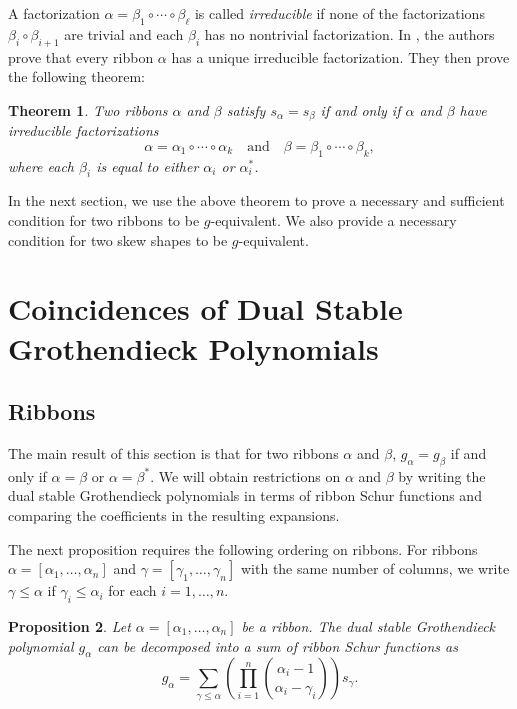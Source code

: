\documentclass[12pt]{amsart}
\newtheorem{thm}{Theorem}[section]
\newtheorem{prop}[thm]{Proposition}
\theoremstyle{definition}
\begin{document}
A factorization $\alpha = \beta_1 \circ \cdots \circ \beta_{\ell}$ is called \textit{irreducible} if none of the factorizations $\beta_i \circ \beta_{i+1}$ are trivial and each $\beta_i$ has no nontrivial factorization. In \cite{billera2006decomposable}, the authors prove that every ribbon $\alpha$ has a unique irreducible factorization. They then prove the following theorem:

\begin{thm}\cite{billera2006decomposable}\label{irred_fact}
Two ribbons $\alpha$ and $\beta$ satisfy $s_{\alpha} = s_{\beta}$ if and only if $\alpha$ and $\beta$ have irreducible factorizations
$$\alpha = \alpha_1 \circ \cdots \circ \alpha_k \quad \textrm{and} \quad \beta = \beta_1 \circ \cdots \circ \beta_k,$$
where each $\beta_i$ is equal to either $\alpha_i$ or $\alpha_i^{*}$.
\end{thm}

In the next section, we use the above theorem to prove a necessary and sufficient condition for two ribbons to be $g$-equivalent. We also provide a necessary condition for two skew shapes to be $g$-equivalent.

\section{Coincidences of Dual Stable Grothendieck Polynomials}

\subsection{Ribbons}
The main result of this section is that for two ribbons $\alpha$ and $\beta$, $g_\alpha = g_\beta$ if and only if $\alpha = \beta$ or $\alpha = \beta^*$. We will obtain restrictions on $\alpha$ and $\beta$ by writing the dual stable Grothendieck polynomials in terms of ribbon Schur functions and comparing the coefficients in the resulting expansions.

The next proposition requires the following ordering on ribbons. 
For ribbons $\alpha = [\alpha_1,\ldots,\alpha_n]$ and $\gamma=[\gamma_1,\ldots,\gamma_n]$ with the same number of columns, we write $\gamma\leq{\alpha}$ if $\gamma_i\leq{\alpha_i}$ for each $i = 1, \ldots, n$.


\begin{prop} \label{ribbon_expand}
Let $\alpha = [\alpha_1,\ldots,\alpha_n]$ be a ribbon. The dual stable Grothendieck polynomial $g_\alpha$ can be decomposed into a sum of ribbon Schur functions as
\[
g_\alpha = \sum_{\gamma \leq \alpha} \left( \prod_{i=1}^{n} \binom{\alpha_i-1}{\alpha_i-\gamma_i} \right) s_\gamma .
\]
\end{prop}
\end{document}
